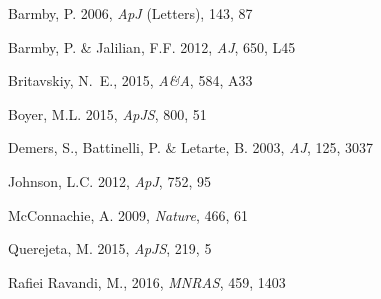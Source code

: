 \documentclass{iau}
\begin{document}
\begin{thebibliography}{}

{{Barmby,} P. \etal} 2006, \textit{ApJ} (Letters), 143, 87

{{Barmby,} P. \& {Jalilian}, F.F.} 2012, \textit{AJ}, 650, L45

{{Britavskiy}, N.~E., \etal}
2015, \textit{A\&A}, 584, A33

{{Boyer}, M.L. \etal} 2015, \textit{ApJS}, 800, 51

{{Demers}, S., {Battinelli}, P. \& {Letarte}, B.} 2003, \textit{AJ}, 125, 3037

{Johnson, L.C. \etal} 2012, \textit{ApJ}, 752, 95

{{McConnachie}, A. \etal} 2009, \textit{Nature}, 466, 61

{{Querejeta}, M. \etal} 2015, \textit{ApJS}, 219, 5

{{Rafiei Ravandi}, M., \etal}  2016, \textit{MNRAS}, 459, 1403


\end{thebibliography}
\end{document}
